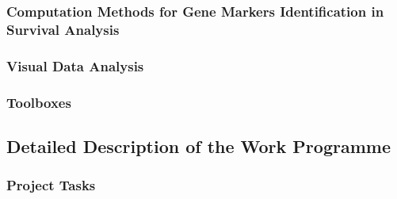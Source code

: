 \documentclass[11pt,a4paper]{article}
\begin{document}
\subsubsection*{Computation Methods for Gene Markers Identification in Survival Analysis}
\subsubsection*{Visual Data Analysis}
\subsubsection*{Toolboxes}

\subsection{Detailed Description of the Work Programme}

\subsubsection{Project Tasks}
\end{document}
